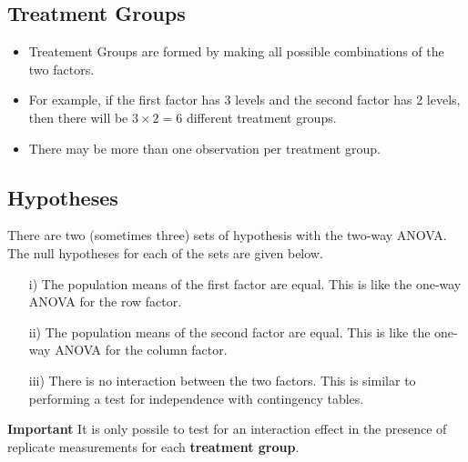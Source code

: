 \documentclass[12pt]{article}
\begin{document}
			\subsection*{Treatment Groups}
			\begin{itemize}
				\item Treatement Groups are formed by making all possible combinations of the two factors. 
				\item For example, if the first factor has 3 levels and the second factor has 2 levels, then there will be $3\times 2=6$ different treatment groups.
				\item There may be more than one observation per treatment group.
			\end{itemize}
	\subsection*{Hypotheses}
	
	There are two (sometimes three) sets of hypothesis with the two-way ANOVA. The null hypotheses for each of the sets are given below.
	
	\begin{itemize}
		\item[i)] The population means of the first factor are equal. This is like the one-way ANOVA for the row factor.
		
		\item[ii)] The population means of the second factor are equal. This is like the one-way ANOVA for the column factor.
		
		\item[iii)] There is no interaction between the two factors. This is similar to performing a test for independence with contingency tables.
		
	\end{itemize}
	
	\noindent \textbf{Important} It is only possile to test for an interaction effect in the presence of replicate measurements for each \textbf{treatment group}.
	
		
\end{document}
